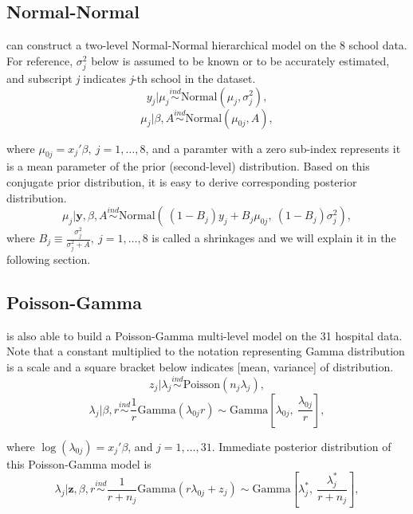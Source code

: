 \documentclass[article]{jss}
\begin{document}
\subsection[Normal-Normal]{Normal-Normal}
 can construct a two-level Normal-Normal hierarchical model on the 8 school data. For reference,  $\sigma^{2}_{j}$ below is assumed to be known or to be accurately estimated, and subscript \emph{j} indicates \emph{j}-th school in the dataset.
\begin{displaymath}
y_{j}\vert \mu_{j} \stackrel{ind}{\sim}\textrm{Normal}(\mu_{j}, \sigma^{2}_{j}),
\end{displaymath}
\begin{displaymath}
\mu_{j}\vert \beta, A\stackrel{ind}{\sim}\textrm{Normal}(\mu_{0j}, A),
\end{displaymath}

where $\mu_{0j} =x_{j}'\beta,~j=1, \ldots, 8$, and a paramter with a zero sub-index represents it is a mean parameter of the prior (second-level) distribution. Based on this conjugate prior distribution, it is easy to derive corresponding posterior distribution. 
\begin{displaymath}
\mu_{j}\vert \textbf{y}, \beta, A \stackrel{ind}{\sim}\textrm{Normal}(~(1-B_{j})y_{j} + B_{j}\mu_{0j},~(1-B_{j})\sigma^{2}_{j}),
\end{displaymath}
where $B_{j}\equiv\frac{\sigma^{2}_{j}}{\sigma^{2}_{j} + A},~j=1, \ldots, 8$ is called a shrinkages and we will explain it in the following section.

\subsection[Poisson-Gamma]{Poisson-Gamma}
 is also able to build a Poisson-Gamma multi-level model on the 31 hospital data. Note that a constant multiplied to the notation representing Gamma distribution is a scale and a square bracket below indicates [mean, variance] of distribution.
\begin{displaymath}
z_{j}\vert \lambda_{j} \stackrel{ind}{\sim}\textrm{Poisson}(n_{j}\lambda_{j}),
\end{displaymath}
\begin{displaymath}
\lambda_{j}\vert \beta, r\stackrel{ind}{\sim}\frac{1}{r}\textrm{Gamma}(\lambda_{0j}r)\sim \textrm{Gamma}[\lambda_{0j}, ~\frac{\lambda_{0j}}{r}],
\end{displaymath}

where $\log(\lambda_{0j}) =x_{j}'\beta$, and $j=1, \ldots, 31$. Immediate posterior distribution of this Poisson-Gamma model is
\begin{displaymath}
\lambda_{j}\vert \textbf{z}, \beta, r \stackrel{ind}{\sim}\frac{1}{r + n_{j}}\textrm{Gamma}(r\lambda_{0j} + z_{j})\sim\textrm{Gamma}[\lambda^{\ast}_{j},~\frac{\lambda^{\ast}_{j}}{r+n_{j}}],
\end{displaymath}
\end{document}
